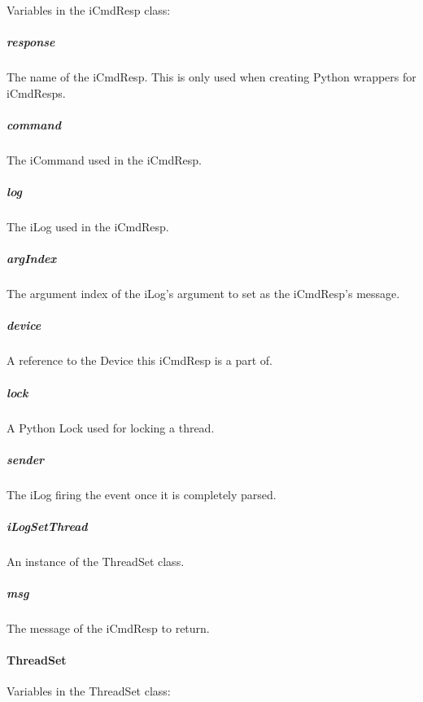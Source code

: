 \documentclass[12pt,letterpaper]{article}
\begin{document}
Variables in the iCmdResp class:

\setcounter{subparagraph}{-1}



%
%
\subparagraph{response}
\label{4.7.2.4.0}

The name of the iCmdResp. This is only used when creating Python wrappers for iCmdResps.



%
%
\subparagraph{command}
\label{4.7.2.4.1}

The iCommand used in the iCmdResp.



%
%
\subparagraph{log}
\label{4.7.2.4.2}

The iLog used in the iCmdResp.



%
%
\subparagraph{argIndex}
\label{4.7.2.4.3}

The argument index of the iLog's argument to set as the iCmdResp's message.



%
%
\subparagraph{device}
\label{4.7.2.4.4}

A reference to the Device this iCmdResp is a part of.



%
%
\subparagraph{lock}
\label{4.7.2.4.5}

A Python Lock used for locking a thread.


%
%
\subparagraph{sender}
\label{4.7.2.4.6}

The iLog firing the event once it is completely parsed.



%
%
\subparagraph{iLogSetThread}
\label{4.7.2.4.7}

An instance of the ThreadSet class.



%
%
\subparagraph{msg}
\label{4.7.2.4.8}

The message of the iCmdResp to return.



%
%
\paragraph{ThreadSet}
\label{4.7.2.5}

Variables in the ThreadSet class:
\end{document}
